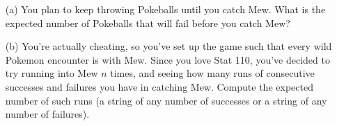 \documentclass{article}
\begin{document}
\begin{enumerate}
    \item[(a)] You plan to keep throwing Pokeballs until you catch Mew. What is the expected number of Pokeballs that will fail before you catch Mew?
    
    
    \item[(b)] You're actually cheating, so you've set up the game such that every wild Pokemon encounter is with Mew. Since you love Stat 110, you've decided to try running into Mew $n$ times, and seeing how many runs of consecutive successes and failures you have in catching Mew. Compute the expected number of such runs (a string of any number of successes or a string of any number of failures).
    

\end{enumerate}
\end{document}
